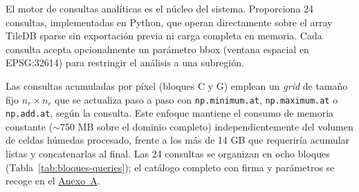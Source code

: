 El motor de consultas analíticas es el núcleo del sistema. Proporciona 24 consultas, implementadas en Python, que operan directamente sobre el array TileDB sparse sin exportación previa ni carga completa en memoria. Cada consulta acepta opcionalmente un parámetro bbox (ventana espacial en EPSG:32614) para restringir el análisis a una subregión.

Las consultas acumuladas por píxel (bloques C y G) emplean un \textit{grid} de tamaño fijo $n_r \times n_c$ que se actualiza paso a paso con \texttt{np.minimum.at}, \texttt{np.maximum.at} o \texttt{np.add.at}, según la consulta. Este enfoque mantiene el consumo de memoria constante ($\sim$750 MB sobre el dominio completo) independientemente del volumen de celdas húmedas procesado, frente a los más de 14 GB que requeriría acumular listas y concatenarlas al final. Las 24 consultas se organizan en ocho bloques (Tabla~\ref{tab:bloques-queries}); el catálogo completo con firma y parámetros se recoge en el \hyperref[anexo-a.-catalogo-completo-de-consultas-analiticas]{Anexo~A}.


